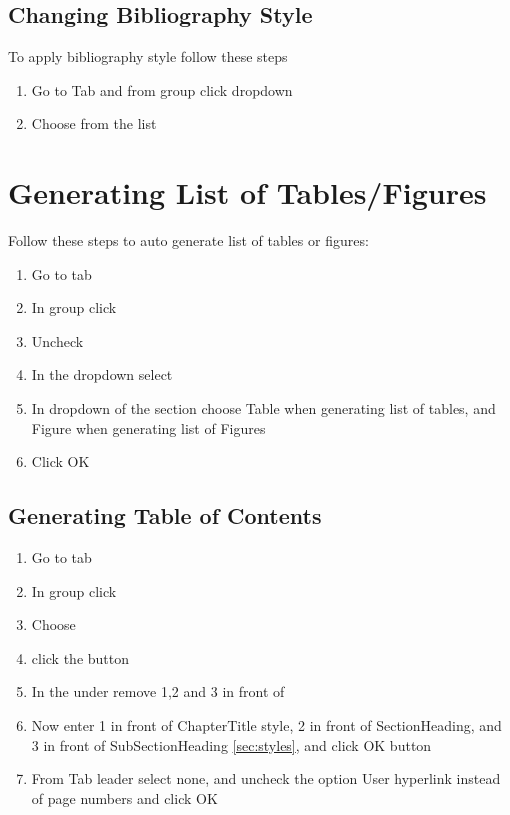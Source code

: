  \subsection{Changing Bibliography Style}
 To apply  bibliography style follow these steps
 \begin{enumerate}
 \item Go to  Tab and from  group click  dropdown
 \item Choose  from the list
 \end{enumerate}
 \section{Generating List of Tables/Figures}
 Follow these steps to auto generate list of tables or figures:
 \begin{enumerate}
 \item Go to  tab 
 \item In  group click 
 \item Uncheck 
 \item In the  dropdown select 
 \item In  dropdown of the  section choose Table when generating list of tables, and Figure when generating list of Figures
 \item Click OK
 \end{enumerate}
 \subsection{Generating Table of Contents}
 
 \begin{enumerate}
     \item Go to  tab 
     \item In  group click 
     \item Choose 
     \item click the  button
     \item In the  under  remove 1,2 and 3 in front of 
     \item Now enter 1 in front of ChapterTitle style, 2 in front of SectionHeading, and 3 in front of SubSectionHeading \ref{sec:styles}, and click OK button
     \item From Tab leader select none, and uncheck the option User hyperlink instead of page numbers and click OK
 \end{enumerate}